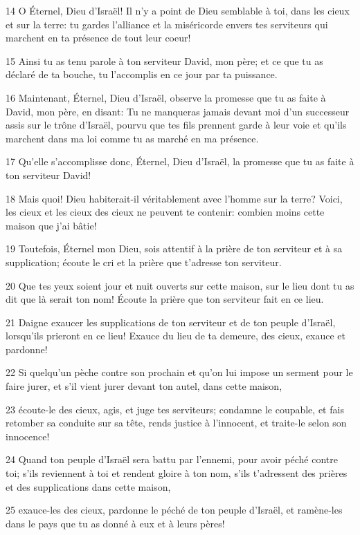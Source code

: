 \par 14 O Éternel, Dieu d'Israël! Il n'y a point de Dieu semblable à toi, dans les cieux et sur la terre: tu gardes l'alliance et la miséricorde envers tes serviteurs qui marchent en ta présence de tout leur coeur!
\par 15 Ainsi tu as tenu parole à ton serviteur David, mon père; et ce que tu as déclaré de ta bouche, tu l'accomplis en ce jour par ta puissance.
\par 16 Maintenant, Éternel, Dieu d'Israël, observe la promesse que tu as faite à David, mon père, en disant: Tu ne manqueras jamais devant moi d'un successeur assis sur le trône d'Israël, pourvu que tes fils prennent garde à leur voie et qu'ils marchent dans ma loi comme tu as marché en ma présence.
\par 17 Qu'elle s'accomplisse donc, Éternel, Dieu d'Israël, la promesse que tu as faite à ton serviteur David!
\par 18 Mais quoi! Dieu habiterait-il véritablement avec l'homme sur la terre? Voici, les cieux et les cieux des cieux ne peuvent te contenir: combien moins cette maison que j'ai bâtie!
\par 19 Toutefois, Éternel mon Dieu, sois attentif à la prière de ton serviteur et à sa supplication; écoute le cri et la prière que t'adresse ton serviteur.
\par 20 Que tes yeux soient jour et nuit ouverts sur cette maison, sur le lieu dont tu as dit que là serait ton nom! Écoute la prière que ton serviteur fait en ce lieu.
\par 21 Daigne exaucer les supplications de ton serviteur et de ton peuple d'Israël, lorsqu'ils prieront en ce lieu! Exauce du lieu de ta demeure, des cieux, exauce et pardonne!
\par 22 Si quelqu'un pèche contre son prochain et qu'on lui impose un serment pour le faire jurer, et s'il vient jurer devant ton autel, dans cette maison,
\par 23 écoute-le des cieux, agis, et juge tes serviteurs; condamne le coupable, et fais retomber sa conduite sur sa tête, rends justice à l'innocent, et traite-le selon son innocence!
\par 24 Quand ton peuple d'Israël sera battu par l'ennemi, pour avoir péché contre toi; s'ils reviennent à toi et rendent gloire à ton nom, s'ils t'adressent des prières et des supplications dans cette maison,
\par 25 exauce-les des cieux, pardonne le péché de ton peuple d'Israël, et ramène-les dans le pays que tu as donné à eux et à leurs pères!
